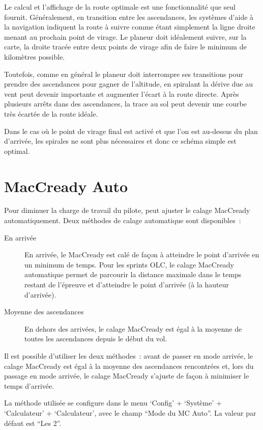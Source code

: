 Le calcul et l'affichage de la route optimale est une fonctionnalité que seul \xc{} fournit.
Généralement, en transition entre les ascendances, les systèmes d'aide à la navigation indiquent la route à suivre comme étant simplement la ligne droite menant au prochain point de virage.
Le planeur doit idéalement suivre, sur la carte, la droite tracée entre deux points de virage afin de faire le minimum de kilomètres possible.

Toutefois, comme en général le planeur doit interrompre ses transitions pour prendre des ascendances pour gagner de l'altitude, en spiralant la dérive due au vent peut devenir importante et augmenter l'écart à la route directe.
Après plusieurs arrêts dans des ascendances, la trace au sol peut devenir une courbe très écartée de la route idéale.

Dans le cas où le point de virage final est activé et que l'on est au-dessus du plan d'arrivée, les spirales ne sont plus nécessaires et donc ce schéma simple est optimal.


\section{MacCready Auto}\label{sec:auto-maccready}

Pour diminuer la charge de travail du pilote, \xc{} peut ajuster le calage MacCready automatiquement.
Deux méthodes de calage automatique sont disponibles~:
\begin{description}
\item[En arrivée] En arrivée, le MacCready est calé de façon à atteindre le point d'arrivée en un minimum de temps.
Pour les sprints OLC, le calage MacCready automatique permet de parcourir la distance maximale dans le temps restant de l'épreuve et d'atteindre le point d'arrivée (à la hauteur d'arrivée).
\item[Moyenne des ascendances] En dehors des arrivées, le calage MacCready est égal à la moyenne de toutes les ascendances depuis le début du vol.
\end{description}
Il est possible d'utiliser les deux méthodes~: avant de passer en mode arrivée, le calage MacCready est égal à la moyenne des ascendances rencontrées et, lors du passage en mode arrivée, le calage MacCready s'ajuste de façon à minimiser le temps d'arrivée.

La méthode utilisée se configure dans le menu `Config' + `Système' + `Calculateur' + `Calculateur', avec le champ ``Mode du MC Auto''.
La valeur par défaut est ``Les 2''.

